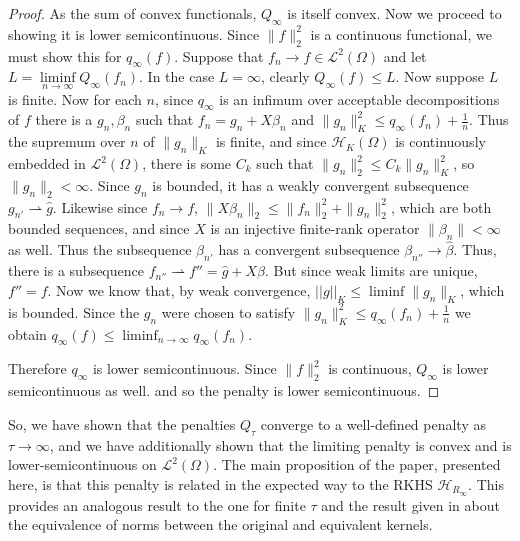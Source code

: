 \documentclass[ejsv2,preprint]{imsart}
\newcommand{\norm}[1]{\left|\left|  #1 \right| \right|}
\newcommand{\weakto}{\rightharpoonup}
\begin{document}
\begin{proof}
    As the sum of convex functionals, $Q_\infty$ is itself convex. Now we proceed to showing it is lower semicontinuous. Since $\|f\|_2^2$ is a continuous functional, we must show this for $q_\infty(f)$. Suppose that $f_n\to f\in \mathcal{L}^2(\Omega)$ and let $L=\underset{n\to\infty}{\liminf}Q_{\infty}(f_n)$. In the case $L=\infty$, clearly $Q_\infty(f)\le L$. Now suppose $L$ is finite. Now for each $n$, since $q_\infty$ is an infimum over acceptable decompositions of $f$ there is a $g_n,\beta_n$ such that $f_n=g_n+X\beta_n$ and $\|g_n\|_{K}^2 \le q_\infty(f_n)+\frac{1}{n} $. Thus the supremum over $n$ of $\|g_n\|_K$ is finite, and since $\mathcal{H}_K(\Omega)$ is continuously embedded in $\mathcal{L}^2(\Omega)$, there is some $C_k$ such that $\|g_n\|_2^2\le C_k\|g_n\|_{K}^2$, so $\|g_n\|_2<\infty$. Since $g_n$ is bounded, it has a weakly convergent subsequence $g_{n'}\rightharpoonup \hat{g}$. Likewise since $f_n\to f$, $\|X\beta_n\|_2\le \|f_n\|_2^2+\|g_n\|_2^2$, which are both bounded sequences, and since $X$ is an injective finite-rank operator $\|\beta_n\|<\infty$ as well. Thus the subsequence $\beta_{n'}$ has a convergent subsequence $\beta_{n''}\to \hat{\beta}$. Thus, there is a subsequence $f_{n''}\weakto f''=\hat{g}+X\hat{\beta}$. But since weak limits are unique, $f''=f$. Now we know that, by weak convergence, $\norm{g}_K\le \liminf\|g_n\|_K$, which is bounded. 
    Since the $g_n$ were chosen to satisfy $\|g_n\|_{K}^2
\leq q_\infty(f_n)+\frac{1}{n}$ we obtain $q_\infty(f)\leq\liminf_{n\to\infty}q_\infty(f_n)$.

Therefore $q_\infty$ is lower semicontinuous. Since $\|f\|_2^2$ is continuous, $Q_\infty$ is lower semicontinuous as well.
    and so the penalty is lower semicontinuous.
\end{proof}

So, we have shown that the penalties $Q_\tau$ converge to a well-defined penalty as $\tau\to\infty$, and we have additionally shown that the limiting penalty is convex and is lower-semicontinuous on $\mathcal{L}^2(\Omega)$. The main proposition of the paper, presented here, is that this penalty is related in the expected way to the RKHS $\mathcal{H}_{R_\infty}$. This provides an analogous result to the one for finite $\tau$ and the result given in \cite{pmlr-v54-flaxman17a} about the equivalence of norms between the original and equivalent kernels.
\end{document}
